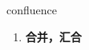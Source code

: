 
\begin{frame}
{\huge confluence}
\begin{center}
\begin{enumerate}\Large
  \item \textbf{合并，汇合}
\end{enumerate}
\end{center}
\end{frame}
